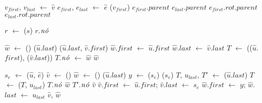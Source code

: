 \begin{algorithm}[htb]
\caption{\LCOFindSubNode($\hat v$, $\hat e$)}
\label{Algo:LCOFindSubNode}
\begin{algorithmic}[1]
\State $v_{first}$, $v_{last}$ $\gets$ $\hat v$
\State $e_{first}$, $e_{last}$ $\gets$ $\hat e$
\State \linkcutEvert($v_{first}$)
\State \Return $e_{first}$.$parent$
\EndIf
\State \Return $e_{last}$.$parent$
\Else
{}
\State \Return $e_{first}.rot.parent$
\Else
\State \Return $e_{last}.rot.parent$
\EndIf
\EndIf
\end{algorithmic}
\end{algorithm}



\begin{algorithm}[htb]
\caption{\LCOFindNode($s$)}
\label{Algo:LCOFindNode}
\begin{algorithmic}[1]
\State $r$ $\gets$ \treapGetRoot($s$)
\State \Return $r$.$\mathit{n\acute{o}}$
\end{algorithmic}
\end{algorithm}


\begin{algorithm}[htb]
\caption{\LCOMerge($\hat u$, $\hat v$)}
\label{Algo:LCOMerge}
\begin{algorithmic}[1]
\State $\hat w$ $\gets$ \LCOMakeNode()
\State \linkcutEvert($\hat u$.$last$)
\State \linkcutAddEdge($\hat u$.$last$, $\hat v$.$first$)
\State $\hat w$.$first$  $\gets$ $\hat u$.$first$
\State $\hat w$.$last$  $\gets$ $\hat v$.$last$
\State $T$ $\gets$ \treapJoin(\treapGetRoot($\hat u$.$first$), \treapGetRoot($\hat v$.$last$))
\State $T$.$\mathit{n\acute{o}}$ $\gets$ $\hat w$
\State \Return $\hat w$
\end{algorithmic}
\end{algorithm}


\begin{algorithm}[htb]
\caption{\LCOSplit($\hat u$, $\hat e$)}
\label{Algo:LCOSplit}
\begin{algorithmic}[1]
\State $s_e$ $\gets$ \LCOFindSubNode($\hat u$, $\hat e$)
\State $\hat v$ $\gets$ \LCOMakeNode()
\State $\hat w$ $\gets$ \LCOMakeNode()
\State \linkcutEvert($\hat u$.$last$)
\State $y$ $\gets$ \linkcutParent($s_e$)
\State \linkcutDelEdge($s_e$)
\State $T$, $u_{last}$, $T'$ $\gets$ \treapSplit($\hat u$.$last$)
\State $T$ $\gets$ \treapJoin($T$, $u_{last}$)
\State $T$.$\mathit{n\acute{o}}$ $\hat w$
\State $T'$.$\mathit{n\acute{o}}$ $\hat v$
\State $\hat v$.$first$ $\gets$ $\hat u$.$first$; $\hat v$.$last$ $\gets$ $s_e$
\State $\hat w$.$first$ $\gets$ $y$; $\hat w$.$last$ $\gets$ $u_{last}$
\State \Return $\hat v$, $\hat w$
\end{algorithmic}
\end{algorithm}


